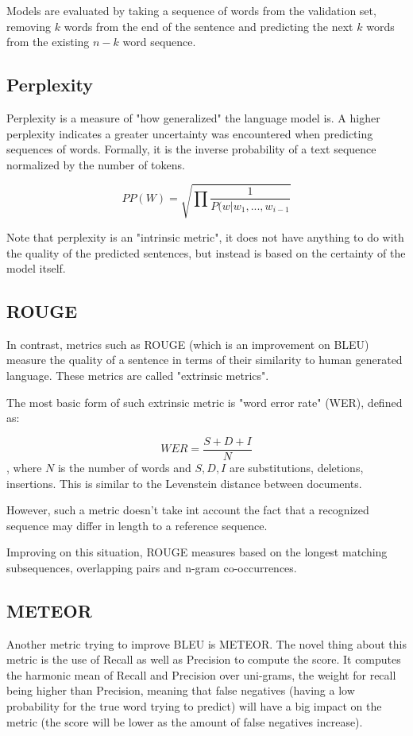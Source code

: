 \documentclass[a4paper]{article}
\begin{document}
Models are evaluated by taking a sequence
of words from the validation set, removing
$k$ words from the end of the sentence and predicting
the next $k$ words from the existing $n - k$ word sequence.

\subsection{Perplexity}
\label{sec:perplexity}

Perplexity is a measure of "how generalized" the language
model is. A higher perplexity indicates a greater uncertainty
was encountered when predicting sequences of words. Formally,
it is the inverse probability of a text sequence normalized
by the number of tokens.

$$ PP(W) = \sqrt{\prod \frac{1}{P(w|w_1, ..., w_{i - 1}}} $$

Note that perplexity is an "intrinsic metric", it does not
have anything to do with the quality of the predicted
sentences, but instead is based on the certainty of the
model itself.

\subsection{ROUGE}
\label{sec:rouge}

In contrast, metrics such as ROUGE (which is an improvement
on BLEU) measure the quality of a sentence in terms of
their similarity to human generated language. These metrics
are called "extrinsic metrics".

The most basic form of such extrinsic metric is "word error
rate" (WER), defined as:

$$ WER = \frac{S + D + I}{N} $$, where $N$ is the number of
words and $S, D, I$ are substitutions, deletions, insertions.
This is similar to the Levenstein distance between documents.

However, such a metric doesn't take int account the fact that
a recognized sequence may differ in length to a reference
sequence.

Improving on this situation, ROUGE measures based on the
longest matching subsequences, overlapping pairs and n-gram
co-occurrences.

\subsection{METEOR}
\label{sec:meteor}
Another metric trying to improve BLEU is
METEOR. The novel thing about this metric is the use of Recall as well as
Precision to compute the score. It computes the harmonic mean of Recall and
Precision over uni-grams, the weight for recall being higher than Precision,
meaning that false negatives (having a low probability for the true word trying
to predict) will have a big impact on the metric (the score will be lower as the
amount of false negatives increase).
\end{document}
